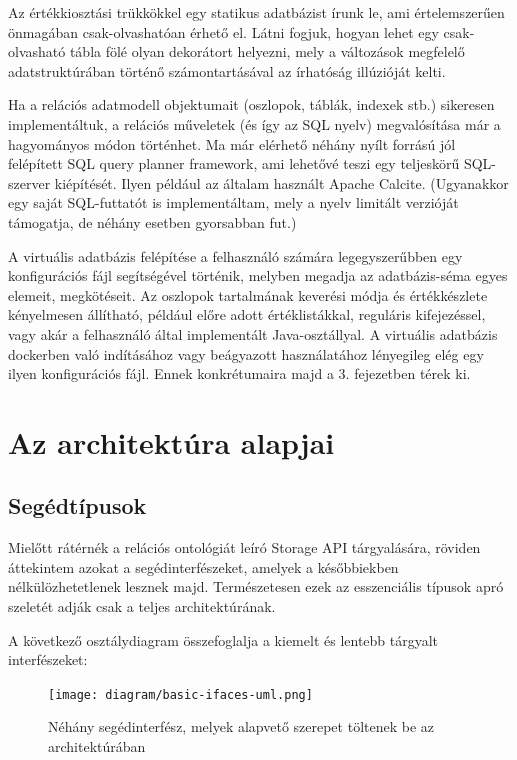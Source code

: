 \documentclass[
    parspace,
    noindent,
    nohyp,
]{elteiktdk}[2023/04/10]
\begin{document}
Az értékkiosztási trükkökkel egy statikus adatbázist írunk le,
ami értelemszerűen önmagában csak-olvashatóan érhető el.
Látni fogjuk, hogyan lehet egy csak-olvasható tábla fölé olyan dekorátort helyezni,
mely a változások megfelelő adatstruktúrában történő számontartásával
az írhatóság illúzióját kelti.

Ha a relációs adatmodell objektumait (oszlopok, táblák, indexek stb.) sikeresen implementáltuk,
a relációs műveletek (és így az SQL nyelv) megvalósítása már a hagyományos módon történhet.
Ma már elérhető néhány nyílt forrású jól felépített SQL query planner framework,
ami lehetővé teszi egy teljeskörű SQL-szerver kiépítését.
Ilyen például az általam használt Apache Calcite.
(Ugyanakkor egy saját SQL-futtatót is implementáltam,
mely a nyelv limitált verzióját támogatja, de néhány esetben gyorsabban fut.)

A virtuális adatbázis felépítése a felhasználó számára legegyszerűbben
egy konfigurációs fájl segítségével történik,
melyben megadja az adatbázis-séma egyes elemeit, megkötéseit.
Az oszlopok tartalmának keverési módja és értékkészlete kényelmesen állítható,
például előre adott értéklistákkal, reguláris kifejezéssel,
vagy akár a felhasználó által implementált Java-osztállyal.
A virtuális adatbázis dockerben való indításához vagy beágyazott használatához
lényegileg elég egy ilyen konfigurációs fájl.
Ennek konkrétumaira majd a 3. fejezetben térek ki.

\section{Az architektúra alapjai}

\subsection{Segédtípusok}

Mielőtt rátérnék a relációs ontológiát leíró Storage API tárgyalására,
röviden áttekintem azokat a segédinterfészeket,
amelyek a későbbiekben nélkülözhetetlenek lesznek majd.
Természetesen ezek az esszenciális típusok apró szeletét adják csak a teljes architektúrának.

A következő osztálydiagram összefoglalja a kiemelt és lentebb tárgyalt interfészeket:

\begin{figure}[H]
\centering
\texttt{[image: diagram/basic-ifaces-uml.png]}
\caption{Néhány segédinterfész, melyek alapvető szerepet töltenek be az architektúrában}
\end{figure}
\end{document}
